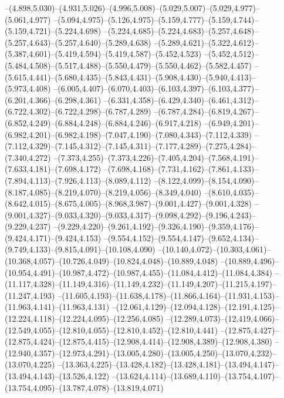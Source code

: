   --(4.898,5.030)--(4.931,5.026)--(4.996,5.008)--(5.029,5.007)--(5.029,4.977)--(5.061,4.977)%
  --(5.094,4.975)--(5.126,4.975)--(5.159,4.777)--(5.159,4.744)--(5.159,4.721)--(5.224,4.698)%
  --(5.224,4.685)--(5.224,4.683)--(5.257,4.648)--(5.257,4.643)--(5.257,4.640)--(5.289,4.638)%
  --(5.289,4.621)--(5.322,4.612)--(5.387,4.601)--(5.419,4.594)--(5.419,4.587)--(5.452,4.523)%
  --(5.452,4.512)--(5.484,4.508)--(5.517,4.488)--(5.550,4.479)--(5.550,4.462)--(5.582,4.457)%
  --(5.615,4.441)--(5.680,4.435)--(5.843,4.431)--(5.908,4.430)--(5.940,4.413)--(5.973,4.408)%
  --(6.005,4.407)--(6.070,4.403)--(6.103,4.397)--(6.103,4.377)--(6.201,4.366)--(6.298,4.361)%
  --(6.331,4.358)--(6.429,4.340)--(6.461,4.312)--(6.722,4.302)--(6.722,4.298)--(6.787,4.289)%
  --(6.787,4.284)--(6.819,4.267)--(6.852,4.249)--(6.884,4.248)--(6.884,4.246)--(6.917,4.218)%
  --(6.949,4.201)--(6.982,4.201)--(6.982,4.198)--(7.047,4.190)--(7.080,4.343)--(7.112,4.339)%
  --(7.112,4.329)--(7.145,4.312)--(7.145,4.311)--(7.177,4.289)--(7.275,4.284)--(7.340,4.272)%
  --(7.373,4.255)--(7.373,4.226)--(7.405,4.204)--(7.568,4.191)--(7.633,4.181)--(7.698,4.172)%
  --(7.698,4.168)--(7.731,4.162)--(7.861,4.133)--(7.894,4.113)--(7.926,4.113)--(8.089,4.112)%
  --(8.122,4.099)--(8.154,4.090)--(8.187,4.085)--(8.219,4.070)--(8.219,4.056)--(8.349,4.040)%
  --(8.610,4.035)--(8.642,4.015)--(8.675,4.005)--(8.968,3.987)--(9.001,4.427)--(9.001,4.328)%
  --(9.001,4.327)--(9.033,4.320)--(9.033,4.317)--(9.098,4.292)--(9.196,4.243)--(9.229,4.237)%
  --(9.229,4.220)--(9.261,4.192)--(9.326,4.190)--(9.359,4.176)--(9.424,4.171)--(9.424,4.153)%
  --(9.554,4.152)--(9.554,4.147)--(9.652,4.134)--(9.749,4.133)--(9.815,4.091)--(10.108,4.090)%
  --(10.140,4.072)--(10.303,4.061)--(10.368,4.057)--(10.726,4.049)--(10.824,4.048)--(10.889,4.048)%
  --(10.889,4.496)--(10.954,4.491)--(10.987,4.472)--(10.987,4.455)--(11.084,4.412)--(11.084,4.384)%
  --(11.117,4.328)--(11.149,4.316)--(11.149,4.232)--(11.149,4.207)--(11.215,4.197)--(11.247,4.193)%
  --(11.605,4.193)--(11.638,4.178)--(11.866,4.164)--(11.931,4.153)--(11.963,4.141)--(11.963,4.131)%
  --(12.061,4.129)--(12.094,4.128)--(12.191,4.125)--(12.224,4.118)--(12.224,4.095)--(12.256,4.085)%
  --(12.289,4.073)--(12.419,4.066)--(12.549,4.055)--(12.810,4.055)--(12.810,4.452)--(12.810,4.441)%
  --(12.875,4.427)--(12.875,4.424)--(12.875,4.415)--(12.908,4.414)--(12.908,4.389)--(12.908,4.380)%
  --(12.940,4.357)--(12.973,4.291)--(13.005,4.280)--(13.005,4.250)--(13.070,4.232)--(13.070,4.225)%
  --(13.363,4.225)--(13.428,4.182)--(13.428,4.181)--(13.494,4.147)--(13.494,4.143)--(13.526,4.122)%
  --(13.624,4.114)--(13.689,4.110)--(13.754,4.107)--(13.754,4.095)--(13.787,4.078)--(13.819,4.071)%
